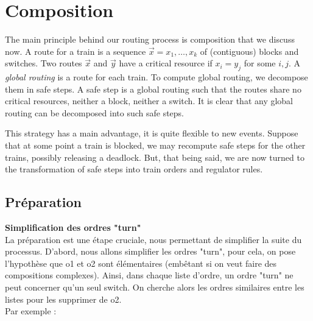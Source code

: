 \documentclass[runningheads]{llncs}
\begin{document}
\section{Composition}
\label{sec:composition}

The main principle behind our routing process is composition that we discuss now. A route for a train is a sequence $\vec{x} = x_1, \ldots, x_k$ of (contiguous) blocks and switches. Two routes $\vec{x}$ and $\vec{y}$ have a critical resource if  $x_i = y_j$ for some $i,j$. A \emph{global routing} is a route for each train. To compute global routing, we decompose them in  safe steps. A safe step is a global routing such that the routes share no critical resources, neither a block, neither a switch. It is clear that any global routing can be decomposed into such safe steps.

This strategy has a main advantage, it is quite flexible to new events. Suppose that at some point a train is blocked, we may recompute safe steps for the other trains, possibly releasing a deadlock. But, that being said, we are now turned to the transformation of safe steps into train orders and regulator rules. 



\subsection{Préparation}
\textbf{Simplification des ordres "turn"}\\
La préparation est une étape cruciale, nous permettant de simplifier la suite du processus.
D'abord, nous allons simplifier les ordres "turn", pour cela, {\color{red} on pose l'hypothèse que o1 et o2 sont élémentaires (embêtant si on veut faire des compositions complexes)}.
Ainsi, dans chaque liste d'ordre, un ordre "turn" ne peut concerner qu'un seul switch. On cherche alors les ordres similaires entre les listes pour les supprimer de o2.
\\Par exemple :
\end{document}
